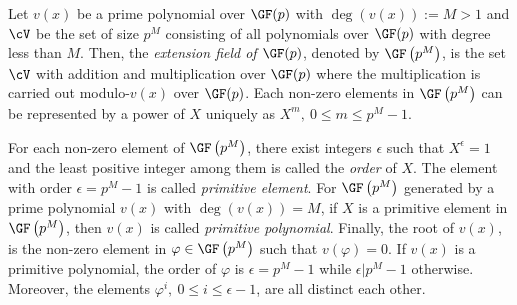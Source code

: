 Let $v(x)$ be a prime polynomial over $\GF(p)$ with $\deg(v(x)):=M>1$ and $\cV$ be the set of size $p^M$ consisting of all polynomials over $\GF(p)$ with degree less than $M$. Then, the \textit{extension field of $\GF(p)$}, denoted by $\GF\left(p^M\right)$, is the set $\cV$ with addition and multiplication over $\GF(p)$ where the multiplication is carried out modulo-$v(x)$ over $\GF(p)$.
Each non-zero elements in $\GF \left(p^M\right)$ can be represented by a power of $X$ uniquely as $X^m,~0 \leq m \leq p^M-1$. %

For each non-zero element of $\GF \left(p^M\right)$, there exist integers $\epsilon$ such that $X^{\epsilon}=1$ and the least positive integer among them is called the \textit{order} of $X$. The element with order $\epsilon=p^M-1$ is called \textit{primitive element}. For $\GF \left(p^M\right)$ generated by a prime polynomial $v(x)$ with $\deg(v(x))=M$, if $X$ is a primitive element in $\GF \left(p^M\right)$, then  $v(x)$ is called \textit{primitive polynomial}. 
%
Finally, the root of $v(x)$, is the non-zero element in $\varphi \in \GF \left(p^M\right)$ such that $v(\varphi)=0$. If $v(x)$ is a primitive polynomial, the order of $\varphi$ is $\epsilon=p^M-1$ while $\epsilon | p^M-1$ otherwise. 
Moreover, the elements $\varphi^i,~0 \leq i \leq \epsilon -1$, are all distinct each other.
 


